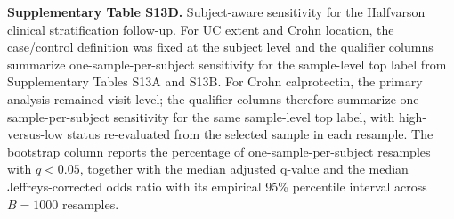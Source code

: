 \noindent\textbf{Supplementary Table S13D.} Subject-aware sensitivity for the Halfvarson clinical stratification follow-up. For UC extent and Crohn location, the case/control definition was fixed at the subject level and the qualifier columns summarize one-sample-per-subject sensitivity for the sample-level top label from Supplementary Tables S13A and S13B. For Crohn calprotectin, the primary analysis remained visit-level; the qualifier columns therefore summarize one-sample-per-subject sensitivity for the same sample-level top label, with high-versus-low status re-evaluated from the selected sample in each resample. The bootstrap column reports the percentage of one-sample-per-subject resamples with $q < 0.05$, together with the median adjusted q-value and the median Jeffreys-corrected odds ratio with its empirical 95\% percentile interval across \(B = 1000\) resamples.

